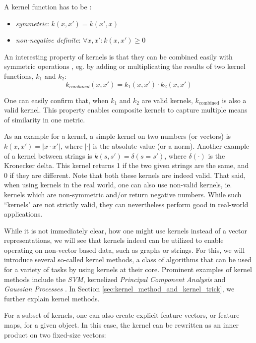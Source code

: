 A kernel function has to be \cite{Kriege2012}:
\begin{itemize}
    \item{\textit{symmetric}: $k(x, x') = k(x', x)$}
    \item{\textit{non-negative definite}: $\forall x, x': k(x, x') \geq 0$}
\end{itemize}

An interesting property of kernels is that they can be combined easily with symmetric operations \cite[p.~296]{Bishop2006}, eg. by adding or multiplicating the results of two kernel functions, $k_1$ and $k_2$:
\begin{equation*}
k_{combined}(x, x') = k_1(x, x') \cdot k_2(x, x')
\end{equation*}

One can easily confirm that, when $k_1$ and $k_2$ are valid kernels, $k_{\mathrm{combined}}$ is also a valid kernel.
This property enables composite kernels to capture multiple means of similarity in one metric.

As an example for a kernel, a simple kernel on two numbers (or vectors) is $k(x, x') = | x \cdot x' |$, where $| \cdot |$ is the absolute value (or a norm).
Another example of a kernel between strings is $k(s, s') = \delta(s = s')$, where $\delta(\cdot)$ is the Kronecker delta. This kernel returns 1 if the two given strings are the same, and 0 if they are different.
Note that both these kernels are indeed valid.
That said, when using kernels in the real world, one can also use non-valid kernels, ie. kernels which are non-symmetric and/or return negative numbers. While such ``kernels" are not strictly valid, they can nevertheless perform good in real-world applications.

While it is not immediately clear, how one might use kernels instead of a vector representations, we will see that kernels indeed can be utilized to enable operating on non-vector based data, such as graphs or strings.
For this, we will introduce several so-called kernel methods, a class of algorithms that can be used for a variety of tasks by using kernels at their core.
Prominent examples of kernel methods include the \textit{SVM}, kernelized \textit{Principal Component Analysis} \cite{Scholkopf1998} and \textit{Gaussian Processes} \cite[p.~303]{Bishop2006}.
In Section \ref{sec:kernel_method_and_kernel_trick}, we further explain kernel methods.

For a subset of kernels, one can also create explicit feature vectors, or feature maps, for a given object. In this case, the kernel can be rewritten as an inner product on two fixed-size vectors:

